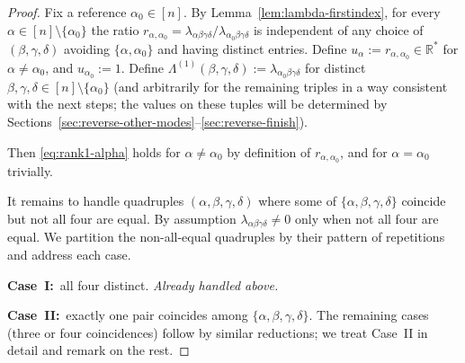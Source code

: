 \documentclass[12pt]{article}
\theoremstyle{definition}
\begin{document}
\begin{proof}
Fix a reference $\alpha_0\in[n]$. By Lemma~\ref{lem:lambda-firstindex}, for every
$\alpha\in[n]\setminus\{\alpha_0\}$ the ratio
$r_{\alpha,\alpha_0}=\lambda_{\alpha\beta\gamma\delta}/\lambda_{\alpha_0\beta\gamma\delta}$
is independent of any choice of $(\beta,\gamma,\delta)$ avoiding $\{\alpha,\alpha_0\}$ and
having distinct entries. Define $u_\alpha:=r_{\alpha,\alpha_0}\in\mathbb{R}^*$ for
$\alpha\neq\alpha_0$, and $u_{\alpha_0}:=1$. Define
$\Lambda^{(1)}(\beta,\gamma,\delta):=\lambda_{\alpha_0\beta\gamma\delta}$ for distinct
$\beta,\gamma,\delta\in[n]\setminus\{\alpha_0\}$ (and arbitrarily for the remaining
triples in a way consistent with the next steps; the values on these tuples will be
determined by Sections~\ref{sec:reverse-other-modes}--\ref{sec:reverse-finish}).

Then \eqref{eq:rank1-alpha} holds for $\alpha\neq\alpha_0$ by definition of $r_{\alpha,\alpha_0}$,
and for $\alpha=\alpha_0$ trivially.

It remains to handle quadruples $(\alpha,\beta,\gamma,\delta)$ where some of
$\{\alpha,\beta,\gamma,\delta\}$ coincide but not all four are equal. By assumption
$\lambda_{\alpha\beta\gamma\delta}\neq 0$ only when not all four are equal. We partition the
non-all-equal quadruples by their pattern of repetitions and address each case.

\textbf{Case~I:}\, all four distinct. \emph{Already handled above.}

\textbf{Case~II:}\, exactly one pair coincides among $\{\alpha,\beta,\gamma,\delta\}$. The
remaining cases (three or four coincidences) follow by similar reductions; we treat
Case~II in detail and remark on the rest.


\end{proof}
\end{document}
